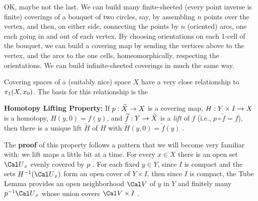 \msk

OK, maybe not the last. We can build many finite-sheeted (every point
inverse is finite) coverings of a bouquet of two circles, say, by 
assembling $n$ points over the vertex, and then, on either side,
connecting the points by $n$ (oriented) arcs, one each going in and out of
each vertex. By choosing orientations on each 1-cell of the bouquet,
we can build a covering map by sending the vertices above to the
vertex, and the arcs to the one cells, homeomorphically, respecting 
the orientations. We can build infinite-sheeted coverings in much 
the same way.

\msk

\leavevmode


\epsfxsize=3in


\bsk

Covering spaces of a (suitably nice) space $X$ have a very close relationship
to $\pi_1(X,x_0)$. The basis for this relationship is the

\msk 

{\bf Homotopy Lifting Property:} If $p:\widetilde{X}\rightarrow X$ is a covering map, 
$H:Y\times I\rightarrow X$ is a homotopy, $H(y,0)=f(y)$, and
$\widetilde{f}:Y\rightarrow \widetilde{X}$ is a {\it lift} of $f$ (i.e., $p\circ \widetilde{f}=f$),
then there is a unique lift $\widetilde{H}$ of $H$ with $\widetilde{H}(y,0)=\widetilde{f}(y)$ .

\msk

The {\bf proof} of this property follows a pattern that we will become 
very familiar with: we lift maps a little bit at a time. For every $x\in X$
there is an open set ${\Cal U}_x$ evenly covered by $p$ . For each fixed
$y\in Y$, since $I$ is compact and the sets $H^{-1}({\Cal U}_x)$ form an
open cover of $Y\times I$, then since $I$ is compact, 
the Tube Lemma provides an open neighborhood 
${\Cal V}$ of $y$ in $Y$ and finitely many $p^{-1}{\Cal U}_{x}$ whose union
covers ${\Cal V}\times I$ . 

\msk

